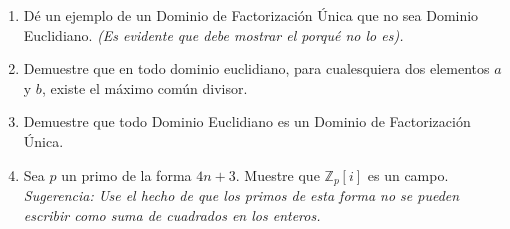 \documentclass[12pt]{article}
\begin{document}
\begin{enumerate}
    \item Dé un ejemplo de un Dominio de Factorización Única que no sea Dominio Euclidiano. 
    \textit{(Es evidente que debe mostrar el porqué no lo es).}
    
    
    \item Demuestre que en todo dominio euclidiano, para cualesquiera dos elementos \(a\) y \(b\), existe el máximo común divisor.
    
    \item Demuestre que todo Dominio Euclidiano es un Dominio de Factorización Única.
    
    \item Sea \(p\) un primo de la forma \(4n + 3\). Muestre que \(\mathbb{Z}_p[i]\) es un campo. 
    \textit{Sugerencia: Use el hecho de que los primos de esta forma no se pueden escribir como suma de cuadrados en los enteros.}
\end{enumerate}
\end{document}
